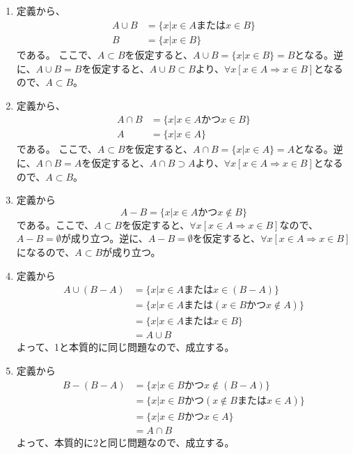 \documentclass{jsarticle}
\begin{document}
\subsection{}
\begin{enumerate}
\item
定義から、
\begin{align*}
A\cup B &= \{x | x\in A または x\in B\}\\
B&= \{x| x\in B\}
\end{align*}である。
ここで、$A\subset B$を仮定すると、$A\cup B = \{x | x\in B\}=B$となる。逆に、$A\cup B= B$を仮定すると、$A\cup B \subset B$より、$\forall x [ x\in A \Longrightarrow x\in B]$となるので、$A\subset B$。\\

\item
定義から、
\begin{align*}
A\cap B &= \{x | x\in A かつ x\in B\}\\
A&= \{x| x\in A\}
\end{align*}である。
ここで、$A\subset B$を仮定すると、$A\cap B = \{x | x\in A\}=A$となる。逆に、$A\cap B= A$を仮定すると、$ A\cap B \supset A$より、$\forall x [ x\in A \Longrightarrow x\in B]$となるので、$A\subset B$。\\

\item 定義から
\[A-B=\{x|x\in A かつ x\notin B\}\]
である。ここで、$A\subset B$を仮定すると、$\forall x [ x\in A \Longrightarrow x\in B]$なので、$A-B=\emptyset$が成り立つ。逆に、$A-B=\emptyset$を仮定すると、$\forall x [ x\in A \Longrightarrow x\in B]$になるので、$A\subset B$が成り立つ。\\

\item 定義から
\begin{align*}
A\cup (B-A)&=\{x|x\in A または x\in (B-A)\}\\
&=\{x|x\in A または (x\in B かつ x\notin A)\}\\
&=\{x|x\in A または x\in B\}\\
&= A\cup B
\end{align*}
よって、1と本質的に同じ問題なので、成立する。\\
\item 定義から
\begin{align*}
B-(B-A)&=\{x| x\in B かつ x\notin (B-A)\}\\
&=\{x| x\in B かつ (x\notin B または x\in A)\}\\
&=\{x| x \in B かつ x\in A\}\\
&= A\cap B
\end{align*}
よって、本質的に2と同じ問題なので、成立する。
\end{enumerate}
\end{document}
